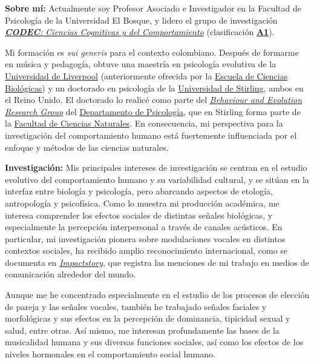 \documentclass[11pt,a4paper,]{awesome-cv}
\begin{document}
\begin{footnotesize}

\textbf{Sobre mí:} Actualmente soy Profesor Asociado e Investigador en la Facultad de Psicología de la Universidad El Bosque, y lidero el grupo de investigación \href{https://investigaciones.unbosque.edu.co/codec}{\textit{\textbf{CODEC}: Ciencias Cognitivas y del Comportamiento}} (clasificación \textbf{\href{https://scienti.minciencias.gov.co/gruplac/jsp/visualiza/visualizagr.jsp?nro=00000000001446}{A1}}). 

Mi formación es \textit{sui generis} para el contexto colombiano. Después de formarme en música y pedagogía, obtuve una maestría en psicología evolutiva de la \href{https://www.liverpool.ac.uk/}{Universidad de Liverpool} (anteriormente ofrecida por la \href{https://www.liverpool.ac.uk/life-sciences/}{Escuela de Ciencias Biológicas}) y un doctorado en psicología de la \href{https://www.stir.ac.uk/}{Universidad de Stirling}, ambos en el Reino Unido. El doctorado lo realicé como parte del \textit{\href{https://www.stir.ac.uk/about/faculties/natural-sciences/our-research/research-groups/behaviour-and-evolution-research-group/}{Behaviour and Evolution Research Group}} del \href{https://www.stir.ac.uk/about/faculties/natural-sciences/psychology/}{Departamento de Psicología}, que en Stirling forma parte de la \href{https://www.stir.ac.uk/about/faculties/natural-sciences/departments/}{Facultad de Ciencias Naturales}. En consecuencia, mi perspectiva para la investigación del comportamiento humano está fuertemente influenciada por el enfoque y métodos de las ciencias naturales.

\textbf{Investigación:} Mis principales intereses de investigación se centran en el estudio evolutivo del comportamiento humano y su variabilidad cultural, y se sitúan en la interfaz entre biología y psicología, pero abarcando aspectos de etología, antropología y psicofísica. Como lo muestra mi producción académica, me interesa comprender los efectos sociales de distintas señales biológicas, y especialmente la percepción interpersonal a través de canales acústicos. En particular, mi investigación pionera sobre modulaciones vocales en distintos contextos sociales, ha recibido amplio reconocimiento internacional, como se documenta en \href{https://profiles.impactstory.org/u/0000-0002-0092-6298}{\textit{Impactstory}}, que registra las menciones de mi trabajo en medios de comunicación alrededor del mundo.

Aunque me he concentrado especialmente en el estudio de los procesos de elección de pareja y las señales vocales, también he trabajado señales faciales y morfológicas y sus efectos en la percepción de dominancia, tipicidad sexual y salud, entre otras. Así mismo, me interesan profundamente las bases de la musicalidad humana y sus diversas funciones sociales, así como los efectos de los niveles hormonales en el comportamiento social humano.


\end{footnotesize}
\end{document}

